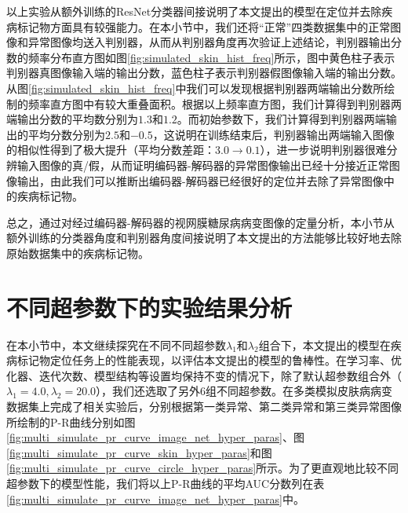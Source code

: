 以上实验从额外训练的ResNet分类器间接说明了本文提出的模型在定位并去除疾病标记物方面具有较强能力。在本小节中，我们还将“正常”四类数据集中的正常图像和异常图像均送入判别器，从而从判别器角度再次验证上述结论，判别器输出分数的频率分布直方图如图\ref{fig:simulated_skin_hist_freq}所示，图中黄色柱子表示判别器真图像输入端的输出分数，蓝色柱子表示判别器假图像输入端的输出分数。从图\ref{fig:simulated_skin_hist_freq}中我们可以发现根据判别器两端输出分数所绘制的频率直方图中有较大重叠面积。根据以上频率直方图，我们计算得到判别器两端输出分数的平均数分别为$1.3 $和$1.2$。而初始参数下，我们计算得到判别器两端输出的平均分数分别为$2.5$和$-0.5$，这说明在训练结束后，判别器输出两端输入图像的相似性得到了极大提升（平均分数差距：$3.0\rightarrow 0.1$），进一步说明判别器很难分辨输入图像的真/假，从而证明编码器-解码器的异常图像输出已经十分接近正常图像输出，由此我们可以推断出编码器-解码器已经很好的定位并去除了异常图像中的疾病标记物。

总之，通过对经过编码器-解码器的视网膜糖尿病病变图像的定量分析，本小节从额外训练的分类器角度和判别器角度间接说明了本文提出的方法能够比较好地去除原始数据集中的疾病标记物。
\section{不同超参数下的实验结果分析}\label{sec:multi_classes_hyper_paras}
在本小节中，本文继续探究在不同不同超参数$\lambda_{1}$和$\lambda_{2}$组合下，本文提出的模型在疾病标记物定位任务上的性能表现，以评估本文提出的模型的鲁棒性。在学习率、优化器、迭代次数、模型结构等设置均保持不变的情况下，除了默认超参数组合外（$\lambda_{1}=4.0,\lambda_{2}=20.0$），我们还选取了另外$6$组不同超参数。在多类模拟皮肤病病变数据集上完成了相关实验后，分别根据第一类异常、第二类异常和第三类异常图像所绘制的P-R曲线分别如图\ref{fig:multi_simulate_pr_curve_image_net_hyper_paras}、图\ref{fig:multi_simulate_pr_curve_skin_hyper_paras}和图\ref{fig:multi_simulate_pr_curve_circle_hyper_paras}所示。为了更直观地比较不同超参数下的模型性能，我们将以上P-R曲线的平均AUC分数列在表\ref{fig:multi_simulate_pr_curve_image_net_hyper_paras}中。

